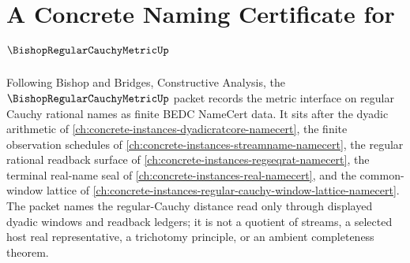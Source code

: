 \chapter{A Concrete Naming Certificate for $\BishopRegularCauchyMetricUp$}
\label{ch:concrete-instances-bishop-regular-cauchy-metric-namecert}

Following Bishop and Bridges, Constructive Analysis, the $\BishopRegularCauchyMetricUp$ packet records the metric interface on regular Cauchy rational names as finite BEDC NameCert data. It sits after the dyadic arithmetic of \autoref{ch:concrete-instances-dyadicratcore-namecert}, the finite observation schedules of \autoref{ch:concrete-instances-streamname-namecert}, the regular rational readback surface of \autoref{ch:concrete-instances-regseqrat-namecert}, the terminal real-name seal of \autoref{ch:concrete-instances-real-namecert}, and the common-window lattice of \autoref{ch:concrete-instances-regular-cauchy-window-lattice-namecert}. The packet names the regular-Cauchy distance read only through displayed dyadic windows and readback ledgers; it is not a quotient of streams, a selected host real representative, a trichotomy principle, or an ambient completeness theorem.

